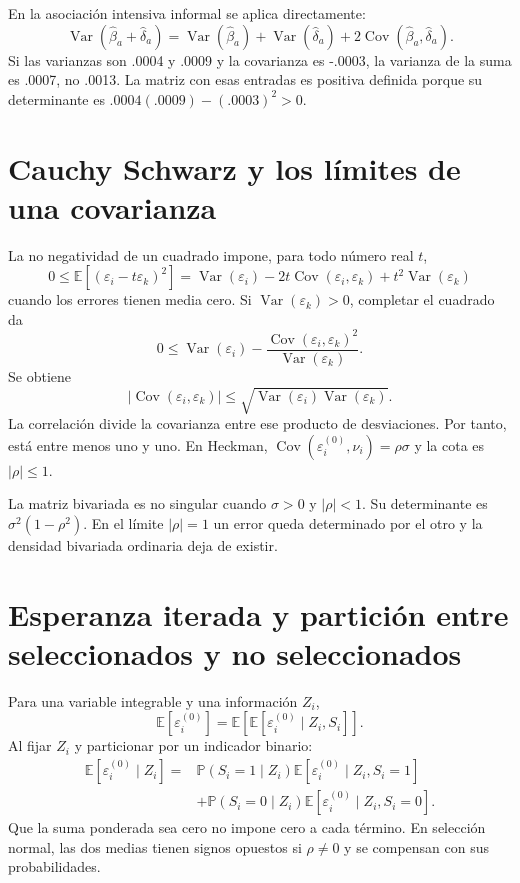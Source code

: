 \documentclass[11pt,a4paper]{article}
\newcommand{\E}{\mathbb E}
\newcommand{\Prob}{\mathbb P}
\newcommand{\abs}[1]{\left\lvert #1\right\rvert}
\DeclareMathOperator{\Var}{Var}
\DeclareMathOperator{\Cov}{Cov}
\begin{document}
En la asociación intensiva informal se aplica directamente:
\[
\Var(\widehat\beta_a+\widehat\delta_a)
=\Var(\widehat\beta_a)+\Var(\widehat\delta_a)
+2\Cov(\widehat\beta_a,\widehat\delta_a).
\]
Si las varianzas son .0004 y .0009 y la covarianza es -.0003, la varianza de la suma es .0007, no .0013. La matriz con esas entradas es positiva definida porque su determinante es $.0004(.0009)-(.0003)^2>0$.

\clearpage
\section{Cauchy Schwarz y los límites de una covarianza}

La no negatividad de un cuadrado impone, para todo número real $t$,
\[
0\le \E[(\varepsilon_i-t\varepsilon_k)^2]
=\Var(\varepsilon_i)-2t\Cov(\varepsilon_i,\varepsilon_k)
+t^2\Var(\varepsilon_k)
\]
cuando los errores tienen media cero. Si $\Var(\varepsilon_k)>0$, completar el cuadrado da
\[
0\le
\Var(\varepsilon_i)-
\frac{\Cov(\varepsilon_i,\varepsilon_k)^2}{\Var(\varepsilon_k)}.
\]
Se obtiene
\[
\abs{\Cov(\varepsilon_i,\varepsilon_k)}
\le\sqrt{\Var(\varepsilon_i)\Var(\varepsilon_k)}.
\]
La correlación divide la covarianza entre ese producto de desviaciones. Por tanto, está entre menos uno y uno. En Heckman, $\Cov(\varepsilon_i^{(0)},\nu_i)=\rho\sigma$ y la cota es $\abs{\rho}\le1$.

La matriz bivariada es no singular cuando $\sigma>0$ y $\abs{\rho}<1$. Su determinante es $\sigma^2(1-\rho^2)$. En el límite $\abs{\rho}=1$ un error queda determinado por el otro y la densidad bivariada ordinaria deja de existir.

\clearpage
\section{Esperanza iterada y partición entre seleccionados y no seleccionados}

Para una variable integrable y una información $Z_i$,
\[
\E[\varepsilon_i^{(0)}]
=\E[\E[\varepsilon_i^{(0)}\mid Z_i,S_i]].
\]
Al fijar $Z_i$ y particionar por un indicador binario:
\[
\begin{aligned}
\E[\varepsilon_i^{(0)}\mid Z_i]
={}&\Prob(S_i=1\mid Z_i)
\E[\varepsilon_i^{(0)}\mid Z_i,S_i=1]\\
&+\Prob(S_i=0\mid Z_i)
\E[\varepsilon_i^{(0)}\mid Z_i,S_i=0].
\end{aligned}
\]
Que la suma ponderada sea cero no impone cero a cada término. En selección normal, las dos medias tienen signos opuestos si $\rho\ne0$ y se compensan con sus probabilidades.
\end{document}

